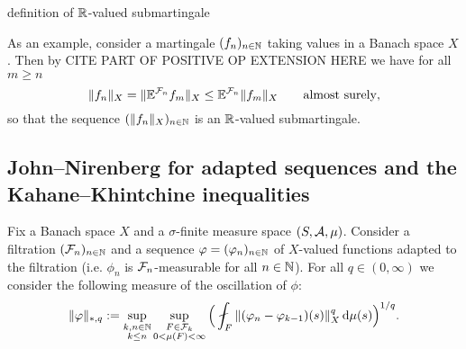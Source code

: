 \begin{defn}
  definition of $\mathbb{R}$-valued submartingale
\end{defn}

As an example, consider a martingale $(f_n)_{n \in \mathbb{N}}$ taking values in a Banach space $X$.
Then by {\color{red} CITE PART OF POSITIVE OP EXTENSION HERE} we have for all $m \geq n$
\begin{equation*}
  \|f_n\|_X = \|\mathbb{E}^{\mathcal{F}_n} f_m\|_X \leq \mathbb{E}^{\mathcal{F}_n} \|f_m\|_X \qquad \text{almost surely},
\end{equation*}
so that the sequence $(\|f_n\|_X)_{n \in \mathbb{N}}$ is an $\mathbb{R}$-valued submartingale.

\begin{thm}
  
\end{thm}


\begin{thm}
  
\end{thm}



\subsection{John--Nirenberg for adapted sequences and the Kahane--Khintchine inequalities}

Fix a Banach space $X$ and a $\sigma$-finite measure space $(S,\mathcal{A},\mu)$.
Consider a filtration $(\mathcal{F}_n)_{n \in \mathbb{N}}$ and a sequence $\varphi = (\varphi_n)_{n \in \mathbb{N}}$ of $X$-valued functions adapted to the filtration (i.e. $\phi_n$ is $\mathcal{F}_n$-measurable for all $n \in \mathbb{N}$).
For all $q \in (0,\infty)$ we consider the following measure of the oscillation of $\phi$:
\begin{equation*}
    \|\phi\|_{*,q} := \sup_{\substack{k,n \in \N \\ k \leq n}} \sup_{\substack{F \in \mc{F}_k \\ 0 < \mu(F) < \infty}} \Big( \fint_{F} \|(\phi_n - \phi_{k-1})(s)\|_{X}^{q} \, \dd\mu(s)\Big)^{1/q} .
\end{equation*}


